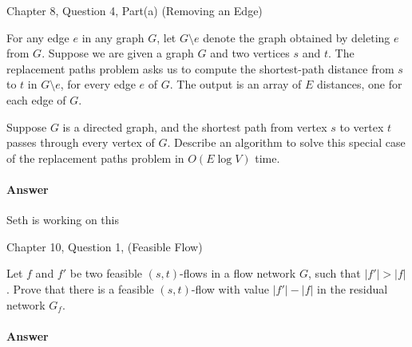 \documentclass{article}
\begin{document}
\nextprob
{}

Chapter 8, Question 4, Part(a) (Removing an Edge)

For any edge $e$ in any graph $G$, let $G \setminus e$ denote the graph obtained by deleting $e$ from $G$.
Suppose we are given a graph $G$ and two vertices $s$ and $t$.
The replacement paths problem asks us to compute the shortest-path distance from $s$ to $t$ in $G \setminus e$, for every edge $e$ of $G$.
The output is an array of $E$ distances, one for each edge of $G$.

Suppose $G$ is a directed graph, and the shortest path from vertex $s$ to vertex $t$ passes through every vertex of $G$.
Describe an algorithm to solve this special case of the replacement paths problem in $O(E \log V)$ time.

\paragraph{Answer}


Seth is working on this


\nextprob
{}

Chapter 10, Question 1, (Feasible Flow)

Let $f$ and $f'$ be two feasible $(s, t)$-flows in a flow network $G$, such that $|f'| > |f|$.
Prove that there is a feasible $(s, t)$-flow with value $|f'| - |f|$ in the residual network $G_f$.

\paragraph{Answer}

\end{document}
